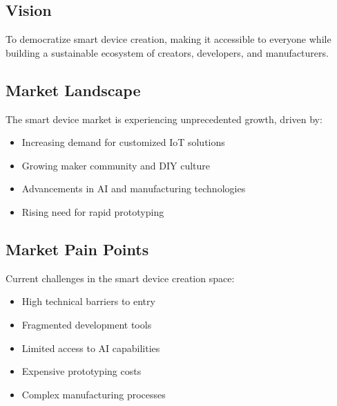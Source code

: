 \subsection{Vision}
To democratize smart device creation, making it accessible to everyone while building a sustainable ecosystem of creators, developers, and manufacturers.

\subsection{Market Landscape}
The smart device market is experiencing unprecedented growth, driven by:
\begin{itemize}[leftmargin=*]
    \item Increasing demand for customized IoT solutions
    \item Growing maker community and DIY culture
    \item Advancements in AI and manufacturing technologies
    \item Rising need for rapid prototyping
\end{itemize}

\subsection{Market Pain Points}
Current challenges in the smart device creation space:
\begin{itemize}[leftmargin=*]
    \item High technical barriers to entry
    \item Fragmented development tools
    \item Limited access to AI capabilities
    \item Expensive prototyping costs
    \item Complex manufacturing processes
\end{itemize}